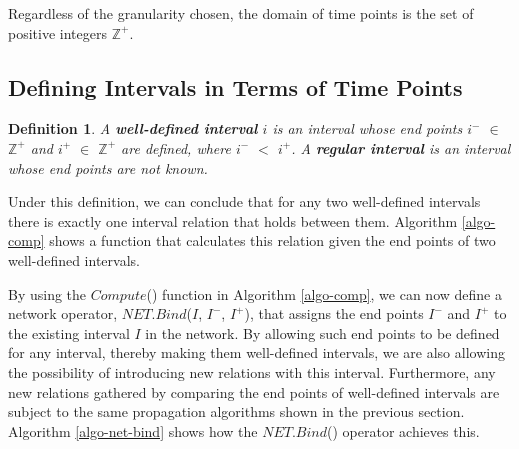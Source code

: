 \documentclass[11pt]{report}
\newtheorem{vdefinition}{Definition}[chapter]
\begin{document}
        Regardless of the granularity chosen, the domain of time points is the set of
        positive integers ${\mathbb Z}^{+}$.

      \subsection{Defining Intervals in Terms of Time Points}

        \begin{vdefinition}
          \label{def-interval}
          A {\bf well-defined interval} $i$ is an interval whose end points
          $i^{-}$ $\in$ ${\mathbb Z}^{+}$ and $i^{+}$ $\in$ ${\mathbb Z}^{+}$
          are defined, where $i^{-}$ $<$ $i^{+}$. A {\bf regular interval} is
          an interval whose end points are not known.
        \end{vdefinition}

        Under this definition, we can conclude that for any two well-defined
        intervals there is exactly one interval relation that holds between
        them. Algorithm \ref{algo-comp} shows a function that calculates this
        relation given the end points of two well-defined intervals.

        By using the $Compute$() function in Algorithm \ref{algo-comp}, we can
        now define a network operator, $NET.Bind$($I$, $I^-$, $I^+$), that
        assigns the end points $I^-$ and $I^+$ to the existing interval $I$ in
        the network. By allowing such end points to be defined for any
        interval, thereby making them well-defined intervals, we are also
        allowing the possibility of introducing new relations with this
        interval. Furthermore, any new relations gathered by comparing the end
        points of well-defined intervals are subject to the same propagation
        algorithms shown in the previous section. Algorithm \ref{algo-net-bind}
        shows how the $NET.Bind$() operator achieves this.
\end{document}
